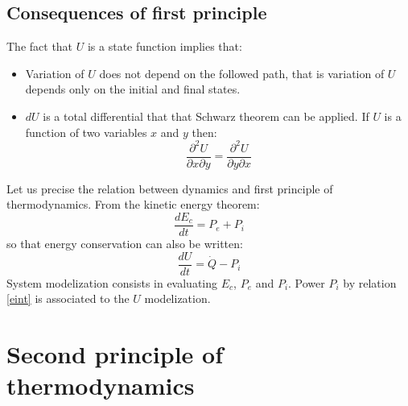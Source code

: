 \documentclass[12pt]{book}
\begin{document}
\subsection{Consequences of first principle}
The fact that $U$ is a state function implies that:
\begin{itemize}
\item Variation of $U$ does not depend on the followed path, that is variation
  of $U$ depends only on the initial and final states.
\item $dU$ is a total differential that that Schwarz theorem can be
  applied. If $U$ is a function of two variables $x$ and $y$ then:
\begin{equation}
\frac{\partial^2 U}{\partial x\partial y}=\frac{\partial^2 U}{\partial
y\partial x} 
\end{equation}
\end{itemize}
Let us precise the relation between dynamics and first principle of
thermodynamics. From the kinetic energy theorem:
\begin{equation}
\frac{dE_c}{dt}=P_e+P_i
\end{equation}
so that energy conservation can also be written:
\begin{equation}\label{eint}
\frac{dU}{dt}=\dot Q-P_i
\end{equation}
System modelization consists in evaluating $E_c$,
$P_e$ and $P_i$. Power $P_i$ by relation
\ref{eint} is associated to the $U$ modelization.
\section{Second principle of thermodynamics}
\end{document}
